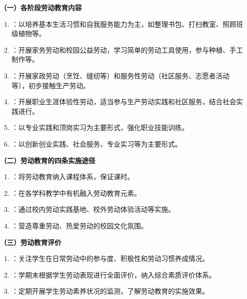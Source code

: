 \begin{defbox}
\textbf{（一）各阶段劳动教育内容}

\begin{enumerate}[leftmargin=*]
    \item {}：以培养基本生活习惯和自我服务能力为主，如整理书包、打扫教室、照顾班级植物等。
    \item {}：开展家务劳动和校园公益劳动，学习简单的劳动工具使用，参与种植、手工制作等。
    \item {}：开展家政劳动（烹饪、缝纫等）和服务性劳动（社区服务、志愿者活动等），初步接触生产劳动。
    \item {}：开展职业生涯体验性劳动，适当参与生产劳动实践和社区服务，结合社会实践进行。
    \item {}：以专业实践和顶岗实习为主要形式，强化职业技能训练。
    \item {}：以创新创业实践、社会服务、专业实习等为主要形式。
\end{enumerate}

\textbf{（二）劳动教育的四条实施途径}

\begin{enumerate}[leftmargin=*]
    \item {}：将劳动教育纳入课程体系，保证课时。
    \item {}：在各学科教学中有机融入劳动教育元素。
    \item {}：通过校内劳动实践基地、校外劳动体验活动等实施。
    \item {}：营造尊重劳动、热爱劳动的校园文化氛围。
\end{enumerate}

\textbf{（三）劳动教育评价}

\begin{enumerate}[leftmargin=*]
    \item {}：关注学生在日常劳动中的参与度、积极性和劳动习惯养成情况。
    \item {}：学期末根据学生劳动表现进行全面评价，纳入综合素质评价体系。
    \item {}：定期开展学生劳动素养状况的监测，了解劳动教育的实施效果。
\end{enumerate}
\end{defbox}

\newpage
